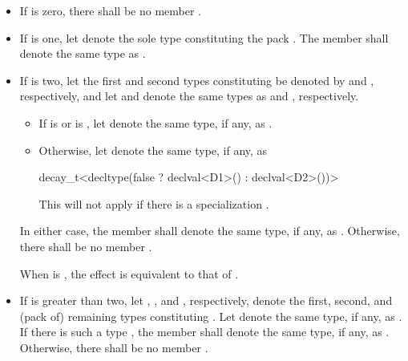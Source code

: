 \begin{itemize}
\item If  is zero, there shall be no member .

\item If  is one, let  denote the sole type
constituting the pack .
The member   shall denote the same
type as .

\item If  is two,
let the first and second types constituting  be denoted
by  and , respectively, and
let  and  denote
the same types as  and , respectively.
  \begin{itemize}
  \item If  is  or
      is ,
     let  denote the same type, if any, as .
  \item Otherwise, let  denote the same type, if any, as
\begin{codeblock}
decay_t<decltype(false ? declval<D1>() : declval<D2>())>
\end{codeblock}
     \begin{note}
     This will not apply if there is a specialization .
     \end{note}
  \end{itemize}
In either case, the member   shall denote
the same type, if any, as .
Otherwise, there shall be no member .
\begin{note}
When  is ,
the effect is equivalent to that of .
\end{note}

\item If  is greater than two,
let , , and , respectively,
denote the first, second, and (pack of) remaining types constituting .
Let  denote the same type, if any, as .
If there is such a type , the member  
shall denote the same type, if any, as .
Otherwise, there shall be no member .
\end{itemize}

